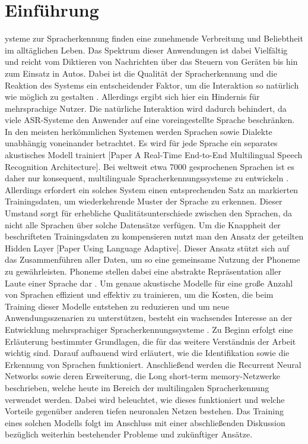 \section{Einführung}\label{sec:introduction}
ysteme zur Spracherkennung finden eine zunehmende Verbreitung und Beliebtheit im alltäglichen Leben. Das Spektrum dieser Anwendungen ist dabei Vielfältig und reicht vom Diktieren von Nachrichten über das Steuern von Geräten bis hin zum Einsatz in Autos. Dabei ist die Qualität der Spracherkennung und die Reaktion des Systems ein entscheidender Faktor, um die Interaktion so natürlich wie möglich zu gestalten \cite{Yu.2014}. Allerdings ergibt sich hier ein Hindernis für mehrsprachige Nutzer. Die natürliche Interaktion wird dadurch behindert, da viele ASR-Systeme den Anwender auf eine voreingestellte Sprache beschränken. In den meisten herkömmlichen Systemen werden Sprachen sowie Dialekte unabhängig voneinander betrachtet. Es wird für jede Sprache ein separates akustisches Modell trainiert [Paper A Real-Time End-to-End Multilingual Speech Recognition Architecture]. Bei weltweit etwa 7000 gesprochenen Sprachen ist es daher nur konsequent, multilinguale Spracherkennungssysteme zu entwickeln \cite{Gary.2018}. Allerdings erfordert ein solches System einen entsprechenden Satz an markierten Trainingsdaten, um wiederkehrende Muster der Sprache zu erkennen. 
Dieser Umstand sorgt für erhebliche Qualitätsunterschiede zwischen den Sprachen, da nicht alle Sprachen über solche Datensätze verfügen. Um die Knappheit der beschrifteten Trainingsdaten zu kompensieren nutzt man den Ansatz der geteilten Hidden Layer [Paper Using Language Adaptive]. Dieser Ansatz stützt sich auf das Zusammenführen aller Daten, um so eine gemeinsame Nutzung der Phoneme zu gewährleisten.  Phoneme stellen dabei eine abstrakte Repräsentation aller Laute einer Sprache dar . Um genaue akustische Modelle für eine große Anzahl von Sprachen effizient und effektiv zu trainieren, um die Kosten, die beim Training dieser Modelle entstehen zu reduzieren und um neue Anwendungsszenarien zu unterstützen, besteht ein wachsendes Interesse an der Entwicklung mehrsprachiger Spracherkennungssysteme \cite{Yu.2014}. 
Zu Beginn erfolgt eine Erläuterung bestimmter Grundlagen, die für das weitere Verständnis der Arbeit wichtig sind. Darauf aufbauend wird erläutert, wie die Identifikation sowie die Erkennung von Sprachen funktioniert. Anschließend werden die Recurrent Neural Networks sowie deren Erweiterung, die Long short-term memory-Netzwerke beschrieben, welche heute im Bereich der multilingalen Spracherkennung verwendet werden. Dabei wird beleuchtet, wie dieses funktioniert und welche Vorteile gegenüber anderen tiefen neuronalen Netzen bestehen. Das Training eines solchen Modells folgt im Anschluss mit einer abschließenden Diskussion bezüglich weiterhin bestehender Probleme und zukünftiger Ansätze.

